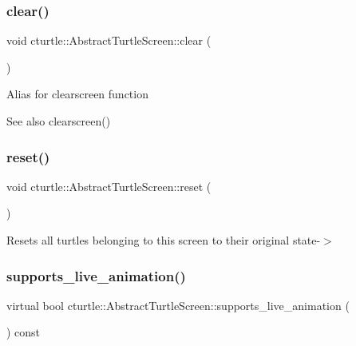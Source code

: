 \subsubsection{\texorpdfstring{clear()}{clear()}}
{\footnotesize\ttfamily void cturtle\+::\+Abstract\+Turtle\+Screen\+::clear (\begin{DoxyParamCaption}{ }\end{DoxyParamCaption})\hspace{0.3cm}{\ttfamily [inline]}}

Alias for clearscreen function \begin{DoxySeeAlso}{See also}
clearscreen() 
\end{DoxySeeAlso}
\mbox{\label{classcturtle_1_1AbstractTurtleScreen_ac791e1eca792e71c356006c96eb98788}} 
\subsubsection{\texorpdfstring{reset()}{reset()}}
{\footnotesize\ttfamily void cturtle\+::\+Abstract\+Turtle\+Screen\+::reset (\begin{DoxyParamCaption}{ }\end{DoxyParamCaption})\hspace{0.3cm}{\ttfamily [inline]}}

Resets all turtles belonging to this screen to their original state-\/$>$ \mbox{\label{classcturtle_1_1AbstractTurtleScreen_aa9651fa98eefdb83fd99d476217b5414}} 
\subsubsection{\texorpdfstring{supports\+\_\+live\+\_\+animation()}{supports\_live\_animation()}}
{\footnotesize\ttfamily virtual bool cturtle\+::\+Abstract\+Turtle\+Screen\+::supports\+\_\+live\+\_\+animation (\begin{DoxyParamCaption}{ }\end{DoxyParamCaption}) const\hspace{0.3cm}{\ttfamily [pure virtual]}}

